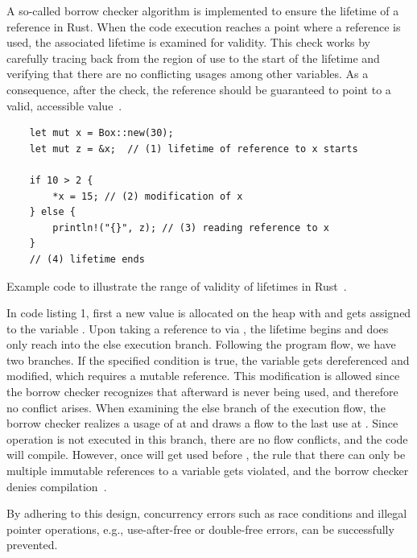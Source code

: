 \documentclass[11pt,
  oneside,openany,    %
]{scrreprt}
\begin{document}
A so-called borrow checker algorithm is implemented to ensure the lifetime of a reference in Rust. When the code execution reaches a point where a reference is used,
the associated lifetime is examined for validity. This check works by carefully 
tracing back from the region of use to the start of the lifetime and verifying that
there are no conflicting usages among other variables. As a consequence, after the check, the reference should be guaranteed to point to a valid, accessible value~\cite{rustBook, rustForRustaceans, memsafetyHui}.

\begin{listing}[H]
\begin{verbatim}
    let mut x = Box::new(30);
    let mut z = &x;  // (1) lifetime of reference to x starts

    if 10 > 2 {
        *x = 15; // (2) modification of x
    } else {
        println!("{}", z); // (3) reading reference to x
    }
    // (4) lifetime ends
\end{verbatim}
  \caption{Example code to illustrate the range of validity of lifetimes in Rust~\cite{rustForRustaceans}.}
  \label{fig:RustLifetime}
\end{listing}


In code listing 1, first a new value is allocated on the heap with  and gets assigned to the variable . Upon taking a reference to  via , the lifetime begins and does only reach into the else execution branch. Following the program flow, we have two branches. If the specified condition is true, the variable  gets dereferenced and modified, which requires a mutable reference. This modification is allowed since the borrow checker recognizes that afterward  is never being used, and therefore no conflict arises. When examining the else branch of the execution flow, the borrow checker realizes a usage of  at  and draws a flow to the last use at . Since operation  is not executed in this branch, there are no flow conflicts, and the code will compile. However, once  will get used before , the rule that there can only be multiple immutable references to a variable gets violated, and the borrow checker denies compilation~\cite{rustForRustaceans}.

By adhering to this design, concurrency errors such as race conditions and illegal pointer operations, e.g., use-after-free or double-free errors, can be successfully prevented.
\end{document}
